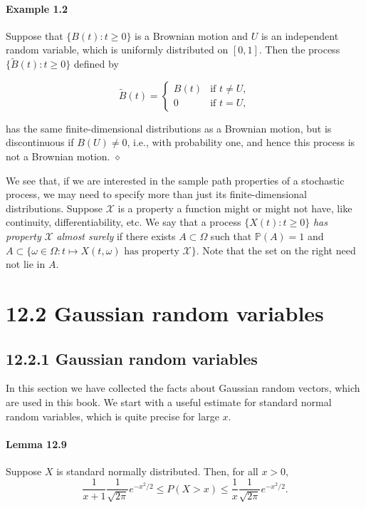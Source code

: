 \documentclass{article}
\begin{document}
\paragraph{Example 1.2} Suppose that $\{B(t) : t \geq 0\}$ is a Brownian motion and $U$ is an independent random variable, which is uniformly distributed on $[0, 1]$. Then the process $\{\tilde{B}(t) : t \geq 0\}$ defined by

\[
\tilde{B}(t) = 
\begin{cases} 
B(t) & \text{if } t \neq U, \\
0 & \text{if } t = U,
\end{cases}
\]

has the same finite-dimensional distributions as a Brownian motion, but is discontinuous if $B(U) \neq 0$, i.e., with probability one, and hence this process is not a Brownian motion. \hfill $\diamond$

We see that, if we are interested in the sample path properties of a stochastic process, we may need to specify more than just its finite-dimensional distributions. Suppose $\mathcal{X}$ is a property a function might or might not have, like continuity, differentiability, etc. We say that a process $\{X(t) : t \geq 0\}$ \textit{has property} $\mathcal{X}$ \textit{almost surely} if there exists $A \subset \Omega$ such that $\mathbb{P}(A) = 1$ and $A \subset \{\omega \in \Omega : t \mapsto X(t, \omega) \text{ has property } \mathcal{X}\}$. Note that the set on the right need not lie in $A$.




\section*{12.2 Gaussian random variables}

\subsection*{12.2.1 Gaussian random variables}

In this section we have collected the facts about Gaussian random vectors, which are used in this book. We start with a useful estimate for standard normal random variables, which is quite precise for large $x$.

\paragraph{Lemma 12.9} Suppose $X$ is standard normally distributed. Then, for all $x > 0$,
\[
\frac{1}{x + 1} \frac{1}{\sqrt{2\pi}} e^{-x^2/2} \leq P(X > x) \leq \frac{1}{x} \frac{1}{\sqrt{2\pi}} e^{-x^2/2}.
\]
\end{document}
